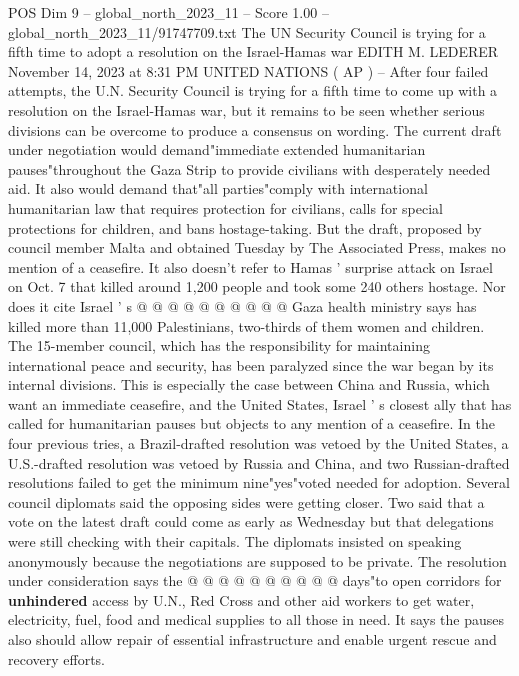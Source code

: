 \begin{textsample}{POS Dim 9 – global\_north\_2023\_11 – Score 1.00 – global\_north\_2023\_11/91747709.txt}  \label{ex:f9_pos_158}
The UN Security Council is trying for a fifth time to adopt a resolution on the Israel-Hamas war EDITH M.
LEDERER November 14, 2023 at 8:31 PM UNITED NATIONS ( AP ) -- After four failed attempts, the U.N.
Security Council is trying for a fifth time to come up with a resolution on the Israel-Hamas war, but it remains to be seen whether serious divisions can be overcome to produce a consensus on wording.
The current draft under negotiation would demand"immediate extended humanitarian pauses"throughout the Gaza Strip to provide civilians with desperately needed aid.
It also would demand that"all parties"comply with international humanitarian law that requires protection for civilians, calls for special protections for children, and bans hostage-taking.
But the draft, proposed by council member Malta and obtained Tuesday by The Associated Press, makes no mention of a ceasefire.
It also doesn't refer to Hamas ' surprise attack on Israel on Oct. 7 that killed around 1,200 people and took some 240 others hostage.
Nor does it cite Israel ' s @ @ @ @ @ @ @ @ @ @ Gaza health ministry says has killed more than 11,000 Palestinians, two-thirds of them women and children.
The 15-member council, which has the responsibility for maintaining international peace and security, has been paralyzed since the war began by its internal divisions.
This is especially the case between China and Russia, which want an immediate ceasefire, and the United States, Israel ' s closest ally that has called for humanitarian pauses but objects to any mention of a ceasefire.
In the four previous tries, a Brazil-drafted resolution was vetoed by the United States, a U.S.-drafted resolution was vetoed by Russia and China, and two Russian-drafted resolutions failed to get the minimum nine"yes"voted needed for adoption.
Several council diplomats said the opposing sides were getting closer.
Two said that a vote on the latest draft could come as early as Wednesday but that delegations were still checking with their capitals.
The diplomats insisted on speaking anonymously because the negotiations are supposed to be private.
The resolution under consideration says the @ @ @ @ @ @ @ @ @ @ days"to open corridors for \textbf{unhindered} access by U.N., Red Cross and other aid workers to get water, electricity, fuel, food and medical supplies to all those in need.
It says the pauses also should allow repair of essential infrastructure and enable urgent rescue and recovery efforts.

\end{textsample}
